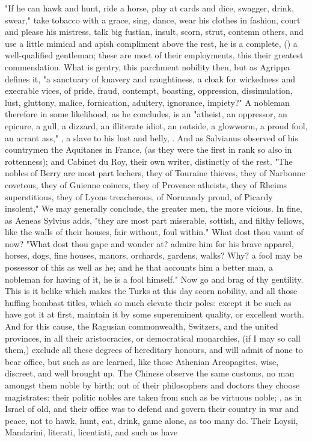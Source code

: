 {\etc{} "If he can hawk and hunt, ride a horse, play at cards and dice, swagger, drink, swear," take tobacco with a grace, sing, dance, wear his clothes in fashion, court and please his mistress, talk big fustian, insult, scorn, strut, contemn others, and use a little mimical and apish compliment above the rest, he is a complete, () a well-qualified gentleman; these are most of their employments, this their greatest commendation. What is gentry, this parchment nobility then, but as Agrippa defines it, "a sanctuary of knavery and naughtiness, a cloak for wickedness and execrable vices, of pride, fraud, contempt, boasting, oppression, dissimulation, lust, gluttony, malice, fornication, adultery, ignorance, impiety?" A nobleman therefore in some likelihood, as he concludes, is an "atheist, an oppressor, an epicure, a gull, a dizzard, an illiterate idiot, an outside, a glowworm, a proud fool, an arrant ass," , a slave to his lust and belly, . And as Salvianus observed of his countrymen the Aquitanes in France,  (as they were the first in rank so also in rottenness); and Cabinet du Roy, their own writer, distinctly of the rest. "The nobles of Berry are most part lechers, they of Touraine thieves, they of Narbonne covetous, they of Guienne coiners, they of Provence atheists, they of Rheims superstitious, they of Lyons treacherous, of Normandy proud, of Picardy insolent," \etc{} We may generally conclude, the greater men, the more vicious. In fine, as Aeneas Sylvius adds, "they are most part miserable, sottish, and filthy fellows, like the walls of their houses, fair without, foul within." What dost thou vaunt of now? "What dost thou gape and wonder at? admire him for his brave apparel, horses, dogs, fine houses, manors, orchards, gardens, walks? Why? a fool may be possessor of this as well as he; and he that accounts him a better man, a nobleman for having of it, he is a fool himself." Now go and brag of thy gentility. This is it belike which makes the Turks at this day scorn nobility, and all those huffing bombast titles, which so much elevate their poles: except it be such as have got it at first, maintain it by some supereminent quality, or excellent worth. And for this cause, the Ragusian commonwealth, Switzers, and the united provinces, in all their aristocracies, or democratical monarchies, (if I may so call them,) exclude all these degrees of hereditary honours, and will admit of none to bear office, but such as are learned, like those Athenian Areopagites, wise, discreet, and well brought up. The Chinese observe the same customs, no man amongst them noble by birth; out of their philosophers and doctors they choose magistrates: their politic nobles are taken from such as be  virtuous noble; , as in Israel of old, and their office was to defend and govern their country in war and peace, not to hawk, hunt, eat, drink, game alone, as too many do. Their Loysii, Mandarini, literati, licentiati, and such as have }
